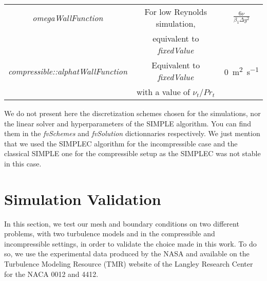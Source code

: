\begin{subappendices}
\begin{table}
\begin{tabular}{ccc}
			\emph{omegaWallFunction} & For low Reynolds simulation, & $\frac{6\nu}{\beta_1\Delta y^2}$ \\
			& equivalent to \emph{fixedValue} & \vspace{0.2cm} \\
			\emph{compressible::alphatWallFunction} & Equivalent to \emph{fixedValue} & \SI{0}{\square\meter\per\second} \\
			& with a value of $\nu_t/Pr_t$ & \\
			\bottomrule
		\end{tabular}
		\label{tab:bound_cond}
	\end{table}
	
	We do not present here the discretization schemes chosen for the simulations, nor the linear solver and hyperparameters of the SIMPLE algorithm. You can find them in the \emph{fvSchemes} and \emph{fvSolution} dictionnaries respectively. We just mention that we used the SIMPLEC \cite{SIMPLEC} algorithm for the incompressible case and the classical SIMPLE \cite{SIMPLE} one for the compressible setup as the SIMPLEC was not stable in this case.
	
	\section{Simulation Validation}\label{ap:validation}
	In this section, we test our mesh and boundary conditions on two different problems, with two turbulence models and in the compressible and incompressible settings, in order to validate the choice made in this work. To do so, we use the experimental data produced by the NASA and available on the Turbulence Modeling Resource (TMR) website of the Langley Research Center \cite{TMR} for the NACA 0012 and 4412.
	

\end{subappendices}
